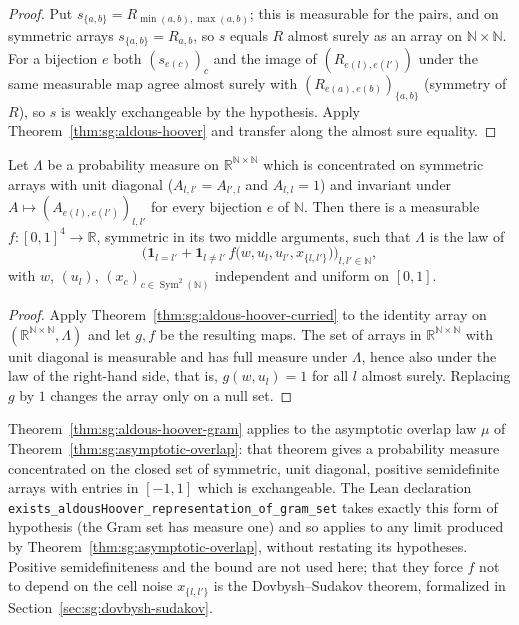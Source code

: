 \begin{proof}
  \leanok
{}
Put $s_{\{a,b\}}=R_{\min(a,b),\max(a,b)}$; this is measurable for the pairs, and on symmetric arrays $s_{\{a,b\}}=R_{a,b}$, so $s$ equals $R$ almost surely as an array on $\mathbb N\times\mathbb N$. For a bijection $e$ both $(s_{e(c)})_c$ and the image of $(R_{e(l),e(l')})$ under the same measurable map agree almost surely with $(R_{e(a),e(b)})_{\{a,b\}}$ (symmetry of $R$), so $s$ is weakly exchangeable by the hypothesis. Apply Theorem~\ref{thm:sg:aldous-hoover} and transfer along the almost sure equality.
\end{proof}

\begin{theorem}\label{thm:sg:aldous-hoover-gram}
  \leanok
Let $\Lambda$ be a probability measure on $\mathbb R^{\mathbb N\times\mathbb N}$ which is concentrated on symmetric arrays with unit diagonal ($A_{l,l'}=A_{l',l}$ and $A_{l,l}=1$) and invariant under $A\mapsto(A_{e(l),e(l')})_{l,l'}$ for every bijection $e$ of $\mathbb N$. Then there is a measurable $f:[0,1]^4\to\mathbb R$, symmetric in its two middle arguments, such that $\Lambda$ is the law of
\[\Big(\mathbf 1_{l=l'}+\mathbf 1_{l\ne l'}\,f\big(w,u_l,u_{l'},x_{\{l,l'\}}\big)\Big)_{l,l'\in\mathbb N},\]
with $w$, $(u_l)$, $(x_c)_{c\in\operatorname{Sym}^2(\mathbb N)}$ independent and uniform on $[0,1]$.
\end{theorem}

\begin{proof}
  \leanok
{}
Apply Theorem~\ref{thm:sg:aldous-hoover-curried} to the identity array on $(\mathbb R^{\mathbb N\times\mathbb N},\Lambda)$ and let $g,f$ be the resulting maps. The set of arrays in $\mathbb R^{\mathbb N\times\mathbb N}$ with unit diagonal is measurable and has full measure under $\Lambda$, hence also under the law of the right-hand side, that is, $g(w,u_l)=1$ for all $l$ almost surely. Replacing $g$ by $1$ changes the array only on a null set.
\end{proof}

Theorem~\ref{thm:sg:aldous-hoover-gram} applies to the asymptotic overlap law $\mu$ of Theorem~\ref{thm:sg:asymptotic-overlap}: that theorem gives a probability measure concentrated on the closed set of symmetric, unit diagonal, positive semidefinite arrays with entries in $[-1,1]$ which is exchangeable. The Lean declaration \texttt{exists\_aldousHoover\_representation\_of\_gram\_set} takes exactly this form of hypothesis (the Gram set has measure one) and so applies to any limit produced by Theorem~\ref{thm:sg:asymptotic-overlap}, without restating its hypotheses. Positive semidefiniteness and the bound are not used here; that they force $f$ not to depend on the cell noise $x_{\{l,l'\}}$ is the Dovbysh--Sudakov theorem, formalized in Section~\ref{sec:sg:dovbysh-sudakov}.

